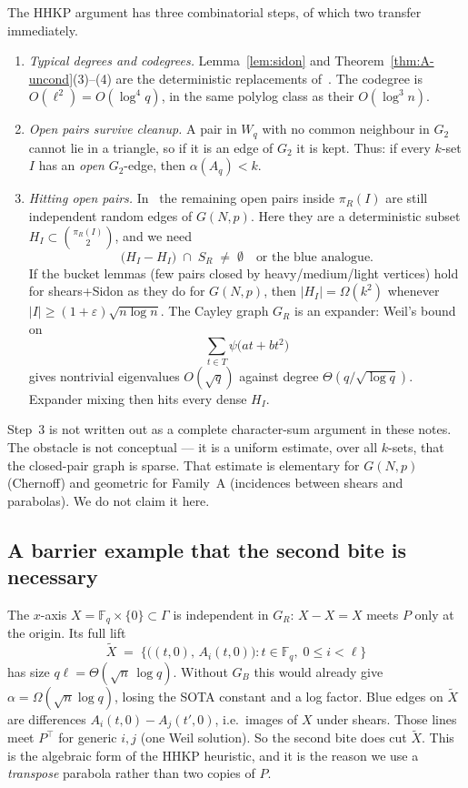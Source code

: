\documentclass[11pt]{article}
\theoremstyle{definition}
\newcommand{\F}{\mathbb{F}}
\newcommand{\bin}[2]{\binom{#1}{#2}}
\newcommand{\eps}{\varepsilon}
\begin{document}
The HHKP argument has three combinatorial steps, of which two transfer immediately.

\begin{enumerate}
  \item \emph{Typical degrees and codegrees.}
    Lemma~\ref{lem:sidon} and Theorem~\ref{thm:A-uncond}(3)--(4) are the deterministic replacements of~\cite[Lemma~3.1]{HHKP2025}.
    The codegree is $O(\ell^{2})=O(\log^{4}q)$, in the same polylog class as their $O(\log^{3}n)$.

  \item \emph{Open pairs survive cleanup.}
    A pair in $W_{q}$ with no common neighbour in $G_{2}$ cannot lie in a triangle, so if it is an edge of $G_{2}$ it is kept.
    Thus: if every $k$-set $I$ has an \emph{open} $G_{2}$-edge, then $\alpha(A_{q})<k$.

  \item \emph{Hitting open pairs.}
    In~\cite{HHKP2025} the remaining open pairs inside $\pi_{R}(I)$ are still independent random edges of $G(N,p)$.
    Here they are a deterministic subset $H_{I}\subset\bin{\pi_{R}(I)}{2}$, and we need
    \[
      \bigl(H_{I}-H_{I}\bigr)\;\cap\;S_{R}\;\ne\;\emptyset
      \quad\text{or the blue analogue.}
    \]
    If the bucket lemmas (few pairs closed by heavy/medium/light vertices) hold for shears+Sidon as they do for $G(N,p)$, then $|H_{I}|=\Omega(k^{2})$ whenever $|I|\ge(1+\eps)\sqrt{n\log n}$.
    The Cayley graph $G_{R}$ is an expander: Weil's bound on
    \[
      \sum_{t\in T}\psi\bigl(a t+b t^{2}\bigr)
    \]
    gives nontrivial eigenvalues $O(\sqrt{q})$ against degree $\Theta(q/\sqrt{\log q})$.
    Expander mixing then hits every dense $H_{I}$.
\end{enumerate}

Step~3 is not written out as a complete character-sum argument in these notes.
The obstacle is not conceptual --- it is a uniform estimate, over all $k$-sets, that the closed-pair graph is sparse.
That estimate is elementary for $G(N,p)$ (Chernoff) and geometric for Family~A (incidences between shears and parabolas).
We do not claim it here.

\subsection{A barrier example that the second bite is necessary}

The $x$-axis $X=\F_{q}\times\{0\}\subset\Gamma$ is independent in $G_{R}$: $X-X=X$ meets $P$ only at the origin.
Its full lift
\[
  \widetilde{X} \;=\; \bigl\{\bigl((t,0),\,A_{i}(t,0)\bigr):t\in\F_{q},\;0\le i<\ell\bigr\}
\]
has size $q\ell=\Theta(\sqrt{n}\,\log q)$.
Without $G_{B}$ this would already give $\alpha=\Omega(\sqrt{n}\log q)$, losing the SOTA constant and a log factor.
Blue edges on $\widetilde{X}$ are differences $A_{i}(t,0)-A_{j}(t',0)$, i.e.\ images of $X$ under shears.
Those lines meet $P^{\top}$ for generic $i,j$ (one Weil solution).
So the second bite does cut $\widetilde{X}$.
This is the algebraic form of the HHKP heuristic, and it is the reason we use a \emph{transpose} parabola rather than two copies of $P$.
\end{document}
